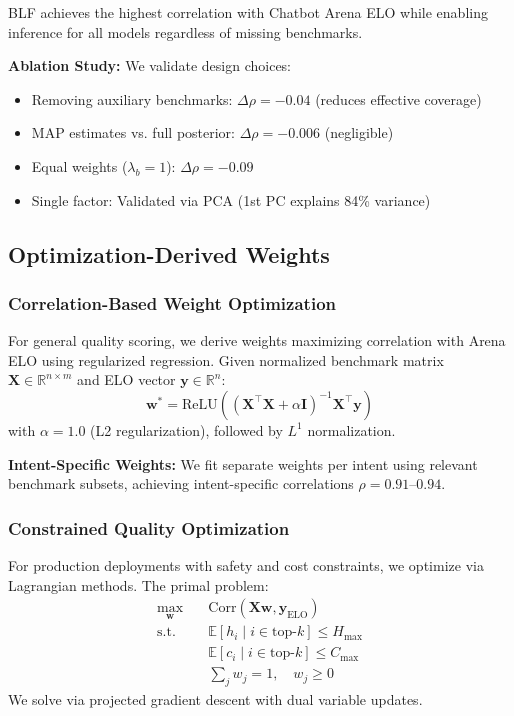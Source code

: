 BLF achieves the highest correlation with Chatbot Arena ELO while enabling inference for all models regardless of missing benchmarks.

\textbf{Ablation Study:} We validate design choices:
%
\begin{itemize}[nosep]
\item Removing auxiliary benchmarks: $\Delta\rho = -0.04$ (reduces effective coverage)
\item MAP estimates vs. full posterior: $\Delta\rho = -0.006$ (negligible)
\item Equal weights ($\lambda_b = 1$): $\Delta\rho = -0.09$
\item Single factor: Validated via PCA (1st PC explains 84\% variance)
\end{itemize}

\subsection{Optimization-Derived Weights}

\subsubsection{Correlation-Based Weight Optimization}

For general quality scoring, we derive weights maximizing correlation with Arena ELO using regularized regression. Given normalized benchmark matrix $\mathbf{X} \in \mathbb{R}^{n \times m}$ and ELO vector $\mathbf{y} \in \mathbb{R}^n$:
%
\begin{equation}
\mathbf{w}^* = \text{ReLU}\left((\mathbf{X}^\top\mathbf{X} + \alpha \mathbf{I})^{-1} \mathbf{X}^\top \mathbf{y}\right)
\end{equation}
%
with $\alpha = 1.0$ (L2 regularization), followed by $L^1$ normalization.

\textbf{Intent-Specific Weights:} We fit separate weights per intent using relevant benchmark subsets, achieving intent-specific correlations $\rho = 0.91$--$0.94$.

\subsubsection{Constrained Quality Optimization}

For production deployments with safety and cost constraints, we optimize via Lagrangian methods. The primal problem:
%
\begin{equation}
\begin{aligned}
\max_{\mathbf{w}} \quad & \text{Corr}(\mathbf{X}\mathbf{w}, \mathbf{y}_{\text{ELO}}) \\
\text{s.t.} \quad & \mathbb{E}[h_i \mid i \in \text{top-}k] \leq H_{\max} \\
& \mathbb{E}[c_i \mid i \in \text{top-}k] \leq C_{\max} \\
& \sum_j w_j = 1, \quad w_j \geq 0
\end{aligned}
\end{equation}
%
We solve via projected gradient descent with dual variable updates.

